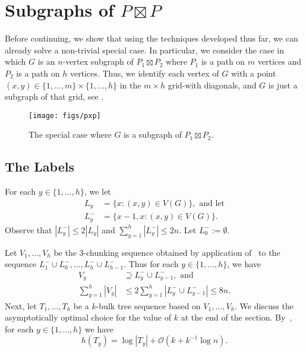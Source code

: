\documentclass[kpfonts]{patmorin}
\newcommand{\Oh}{\mathcal{O}}
\let\le\leqslant
\let\leq\leqslant
\begin{document}
\section{Subgraphs of $P\boxtimes P$}

Before continuing, we show that using the techniques developed thus far, we can already solve a non-trivial special case.  In particular, we consider the case in which $G$ is an $n$-vertex subgraph of $P_1\boxtimes P_2$ where $P_1$ is a path on $m$ vertices and $P_2$ is a path on $h$ vertices.
Thus, we identify each vertex of $G$ with a point $(x,y)\in\{1,\ldots,m\}\times \{1,\ldots,h\}$ in the $m\times h$ grid-with diagonals, and $G$ is just a subgraph of that grid, see .

\begin{figure}
  \begin{center}
    \texttt{[image: figs/pxp]}
  \end{center}
  \caption{The special case where $G$ is a subgraph of $P_1\boxtimes P_2$.}
\end{figure}


\subsection{The Labels}

For each $y\in\{1,\ldots,h\}$, we let 
\begin{align*}
L_y&=\{x:(x,y)\in V(G)\}, \textrm{ and let}\\
L^-_y&=\{x-1,x:(x,y)\in V(G)\}.  
\end{align*}
Observe that $|L^-_y|\le 2|L_y|$ and $\sum_{y=1}^h |L^-_y|\le 2n$.
Let $L^-_0:=\emptyset$.

Let $V_1,\ldots,V_{h}$ be the $3$-chunking sequence obtained by application 
of~ to the sequence $L^-_{1}\cup L^-_{0},\ldots,L^-_{h}\cup L^-_{h-1}$.
Thus for each $y\in\{1,\ldots,h\}$, we have
\begin{align*}
V_y&\supseteq L^-_{y}\cup L^-_{y-1}, \textrm{ and}\\
\textstyle\sum_{y=1}^h |V_y|&\le 2\textstyle\sum_{y=1}^h |L^-_{y}\cup L^-_{y-1}|\leq 8n.
\end{align*}
Next, let $T_1,\ldots,T_h$ be a $k$-bulk tree sequence based on $V_1,\ldots,V_{h}$. 
We discuss the asymptotically optimal choice for the value of $k$ at the end of the section.
By~, for each $y\in\{1,\ldots,h\}$ we have
\[
h(T_y)=\log|T_y| + \Oh(k+k^{-1}\log n).
\]
\end{document}
